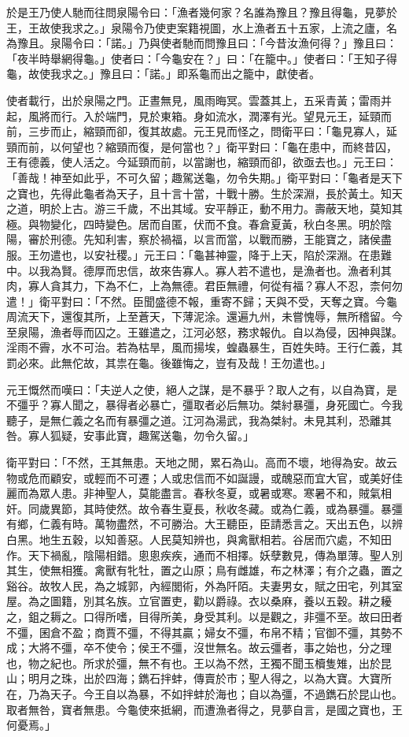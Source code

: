 \begin{pinyinscope}
於是王乃使人馳而往問泉陽令曰：「漁者幾何家？名誰為豫且？豫且得龜，見夢於王，王故使我求之。」泉陽令乃使吏案籍視圖，水上漁者五十五家，上流之廬，名為豫且。泉陽令曰：「諾。」乃與使者馳而問豫且曰：「今昔汝漁何得？」豫且曰：「夜半時舉網得龜。」使者曰：「今龜安在？」曰：「在籠中。」使者曰：「王知子得龜，故使我求之。」豫且曰：「諾。」即系龜而出之籠中，獻使者。

使者載行，出於泉陽之門。正晝無見，風雨晦冥。雲蓋其上，五采青黃；雷雨并起，風將而行。入於端門，見於東箱。身如流水，潤澤有光。望見元王，延頸而前，三步而止，縮頸而卻，復其故處。元王見而怪之，問衛平曰：「龜見寡人，延頸而前，以何望也？縮頸而復，是何當也？」衛平對曰：「龜在患中，而終昔囚，王有德義，使人活之。今延頸而前，以當謝也，縮頸而卻，欲亟去也。」元王曰：「善哉！神至如此乎，不可久留；趣駕送龜，勿令失期。」衛平對曰：「龜者是天下之寶也，先得此龜者為天子，且十言十當，十戰十勝。生於深淵，長於黃土。知天之道，明於上古。游三千歲，不出其域。安平靜正，動不用力。壽蔽天地，莫知其極。與物變化，四時變色。居而自匿，伏而不食。春倉夏黃，秋白冬黑。明於陰陽，審於刑德。先知利害，察於禍福，以言而當，以戰而勝，王能寶之，諸侯盡服。王勿遣也，以安社稷。」元王曰：「龜甚神靈，降于上天，陷於深淵。在患難中。以我為賢。德厚而忠信，故來告寡人。寡人若不遣也，是漁者也。漁者利其肉，寡人貪其力，下為不仁，上為無德。君臣無禮，何從有福？寡人不忍，柰何勿遣！」衛平對曰：「不然。臣聞盛德不報，重寄不歸；天與不受，天奪之寶。今龜周流天下，還復其所，上至蒼天，下薄泥涂。還遍九州，未嘗愧辱，無所稽留。今至泉陽，漁者辱而囚之。王雖遣之，江河必怒，務求報仇。自以為侵，因神與謀。淫雨不霽，水不可治。若為枯旱，風而揚埃，蝗蟲暴生，百姓失時。王行仁義，其罰必來。此無佗故，其祟在龜。後雖悔之，豈有及哉！王勿遣也。」

元王慨然而嘆曰：「夫逆人之使，絕人之謀，是不暴乎？取人之有，以自為寶，是不彊乎？寡人聞之，暴得者必暴亡，彊取者必后無功。桀紂暴彊，身死國亡。今我聽子，是無仁義之名而有暴彊之道。江河為湯武，我為桀紂。未見其利，恐離其咎。寡人狐疑，安事此寶，趣駕送龜，勿令久留。」

衛平對曰：「不然，王其無患。天地之閒，累石為山。高而不壞，地得為安。故云物或危而顧安，或輕而不可遷；人或忠信而不如誕謾，或醜惡而宜大官，或美好佳麗而為眾人患。非神聖人，莫能盡言。春秋冬夏，或暑或寒。寒暑不和，賊氣相奸。同歲異節，其時使然。故令春生夏長，秋收冬藏。或為仁義，或為暴彊。暴彊有鄉，仁義有時。萬物盡然，不可勝治。大王聽臣，臣請悉言之。天出五色，以辨白黑。地生五穀，以知善惡。人民莫知辨也，與禽獸相若。谷居而穴處，不知田作。天下禍亂，陰陽相錯。悤悤疾疾，通而不相擇。妖孽數見，傳為單薄。聖人別其生，使無相獲。禽獸有牝牡，置之山原；鳥有雌雄，布之林澤；有介之蟲，置之谿谷。故牧人民，為之城郭，內經閭術，外為阡陌。夫妻男女，賦之田宅，列其室屋。為之圖籍，別其名族。立官置吏，勸以爵祿。衣以桑麻，養以五穀。耕之耰之，鉏之耨之。口得所嗜，目得所美，身受其利。以是觀之，非彊不至。故曰田者不彊，囷倉不盈；商賈不彊，不得其贏；婦女不彊，布帛不精；官御不彊，其勢不成；大將不彊，卒不使令；侯王不彊，沒世無名。故云彊者，事之始也，分之理也，物之紀也。所求於彊，無不有也。王以為不然，王獨不聞玉櫝隻雉，出於昆山；明月之珠，出於四海；鐫石拌蚌，傳賣於市；聖人得之，以為大寶。大寶所在，乃為天子。今王自以為暴，不如拌蚌於海也；自以為彊，不過鐫石於昆山也。取者無咎，寶者無患。今龜使來抵網，而遭漁者得之，見夢自言，是國之寶也，王何憂焉。」


\end{pinyinscope}
